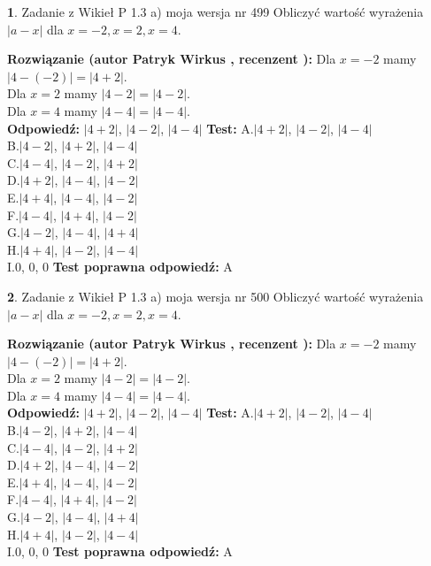 \documentclass[12pt, a4paper]{article}
\theoremstyle{definition} %
\newtheorem{zad}{}
\newcommand{\zadStart}[1]{\begin{zad}#1\newline}
\newcommand{\zadStop}{\end{zad}}
\newcommand{\rozwStart}[2]{\noindent \textbf{Rozwiązanie (autor #1 , recenzent #2): }\newline}
\newcommand{\rozwStop}{\newline}
\newcommand{\odpStart}{\noindent \textbf{Odpowiedź:}\newline}
\newcommand{\odpStop}{\newline}
\newcommand{\testStart}{\noindent \textbf{Test:}\newline}
\newcommand{\testStop}{\newline}
\newcommand{\kluczStart}{\noindent \textbf{Test poprawna odpowiedź:}\newline}
\newcommand{\kluczStop}{\newline}
\begin{document}
\zadStart{Zadanie z Wikieł P 1.3 a) moja wersja nr 499}
Obliczyć wartość wyrażenia $|a - x|$ dla $x=-2,x=2,x=4$.
\zadStop
\rozwStart{Patryk Wirkus}{}
Dla $x = -2$ mamy $|4 - (-2)| = |4 + 2|$.\\
Dla $x = 2$ mamy $|4 - 2| = |4 - 2|$.\\
Dla $x = 4$ mamy $|4 - 4| = |4 - 4|$.\\
\rozwStop
\odpStart
$|4 + 2|$, $|4 - 2|$, $|4 - 4|$
\odpStop
\testStart
A.$|4 + 2|$, $|4 - 2|$, $|4 - 4|$\\
B.$|4 - 2|$, $|4 + 2|$, $|4 - 4|$\\
C.$|4 - 4|$, $|4 - 2|$, $|4 + 2|$\\
D.$|4 + 2|$, $|4 - 4|$, $|4 - 2|$\\
E.$|4 + 4|$, $|4 - 4|$, $|4 - 2|$\\
F.$|4 - 4|$, $|4 + 4|$, $|4 - 2|$\\
G.$|4 - 2|$, $|4 - 4|$, $|4 + 4|$\\
H.$|4 + 4|$, $|4 - 2|$, $|4 - 4|$\\
I.$0$, $0$, $0$
\testStop
\kluczStart
A
\kluczStop



\zadStart{Zadanie z Wikieł P 1.3 a) moja wersja nr 500}
Obliczyć wartość wyrażenia $|a - x|$ dla $x=-2,x=2,x=4$.
\zadStop
\rozwStart{Patryk Wirkus}{}
Dla $x = -2$ mamy $|4 - (-2)| = |4 + 2|$.\\
Dla $x = 2$ mamy $|4 - 2| = |4 - 2|$.\\
Dla $x = 4$ mamy $|4 - 4| = |4 - 4|$.\\
\rozwStop
\odpStart
$|4 + 2|$, $|4 - 2|$, $|4 - 4|$
\odpStop
\testStart
A.$|4 + 2|$, $|4 - 2|$, $|4 - 4|$\\
B.$|4 - 2|$, $|4 + 2|$, $|4 - 4|$\\
C.$|4 - 4|$, $|4 - 2|$, $|4 + 2|$\\
D.$|4 + 2|$, $|4 - 4|$, $|4 - 2|$\\
E.$|4 + 4|$, $|4 - 4|$, $|4 - 2|$\\
F.$|4 - 4|$, $|4 + 4|$, $|4 - 2|$\\
G.$|4 - 2|$, $|4 - 4|$, $|4 + 4|$\\
H.$|4 + 4|$, $|4 - 2|$, $|4 - 4|$\\
I.$0$, $0$, $0$
\testStop
\kluczStart
A
\kluczStop
\end{document}
